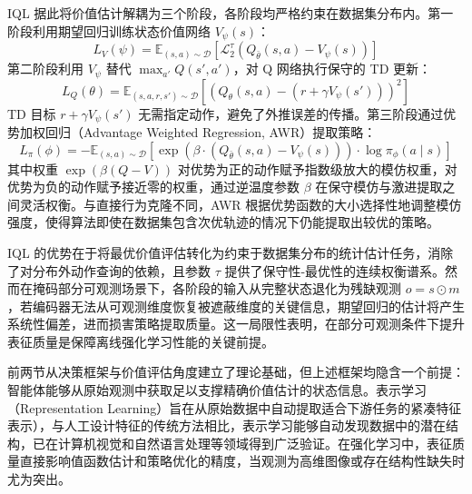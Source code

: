 IQL 据此将价值估计解耦为三个阶段，各阶段均严格约束在数据集分布内。第一阶段利用期望回归训练状态价值网络 $V_\psi(s)$：
\begin{equation}
    L_V(\psi) = \mathbb{E}_{(s, a) \sim \mathcal{D}}\!\left[ \mathcal{L}_2^\tau\!\left( Q_{\bar{\theta}}(s, a) - V_\psi(s) \right) \right]
\end{equation}
第二阶段利用 $V_\psi$ 替代 $\max_{a'} Q(s', a')$，对 Q 网络执行保守的 TD 更新：
\begin{equation}
    L_Q(\theta) = \mathbb{E}_{(s, a, r, s') \sim \mathcal{D}}\!\left[ \left( Q_\theta(s, a) - \left( r + \gamma V_\psi(s') \right) \right)^2 \right]
\end{equation}
TD 目标 $r + \gamma V_\psi(s')$ 无需指定动作，避免了外推误差的传播。第三阶段通过优势加权回归（Advantage Weighted Regression, AWR）\cite{peng2019advantage}提取策略：
\begin{equation}
    L_\pi(\phi) = -\mathbb{E}_{(s, a) \sim \mathcal{D}}\!\left[ \exp\!\left( \beta \cdot \left( Q_{\bar{\theta}}(s, a) - V_\psi(s) \right) \right) \cdot \log \pi_\phi(a \mid s) \right]
\end{equation}
其中权重 $\exp(\beta(Q - V))$ 对优势为正的动作赋予指数级放大的模仿权重，对优势为负的动作赋予接近零的权重，通过逆温度参数 $\beta$ 在保守模仿与激进提取之间灵活权衡。与直接行为克隆不同，AWR 根据优势函数的大小选择性地调整模仿强度，使得算法即使在数据集包含次优轨迹的情况下仍能提取出较优的策略。

IQL 的优势在于将最优价值评估转化为约束于数据集分布的统计估计任务，消除了对分布外动作查询的依赖，且参数 $\tau$ 提供了保守性-最优性的连续权衡谱系。然而在掩码部分可观测场景下，各阶段的输入从完整状态退化为残缺观测 $o = s \odot m$，若编码器无法从可观测维度恢复被遮蔽维度的关键信息，期望回归的估计将产生系统性偏差，进而损害策略提取质量。这一局限性表明，在部分可观测条件下提升表征质量是保障离线强化学习性能的关键前提。



前两节从决策框架与价值评估角度建立了理论基础，但上述框架均隐含一个前提：智能体能够从原始观测中获取足以支撑精确价值估计的状态信息。表示学习（Representation Learning）旨在从原始数据中自动提取适合下游任务的紧凑特征表示）\cite{bengio2013representation}，与人工设计特征的传统方法相比，表示学习能够自动发现数据中的潜在结构，已在计算机视觉\cite{he2016deep}和自然语言处\cite{vaswani2017attention}理等领域得到广泛验证。在强化学习中，表征质量直接影响值函数估计和策略优化的精度，当观测为高维图像或存在结构性缺失时尤为突出。

